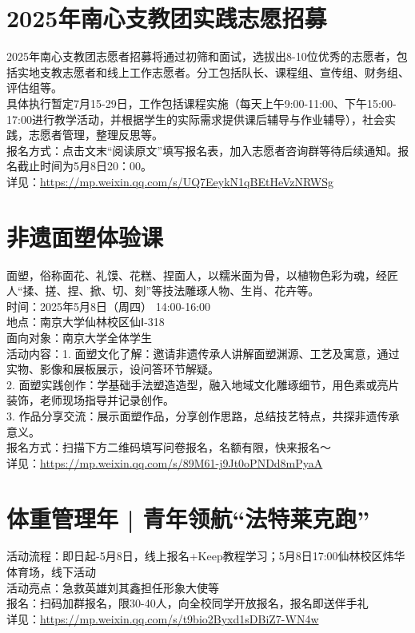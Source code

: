 \documentclass[letterpaper, 12pt]{article}
\begin{document}
\begin{multicols}{2}
\section{2025年南心支教团实践志愿招募} %
2025年南心支教团志愿者招募将通过初筛和面试，选拔出8-10位优秀的志愿者，包括实地支教志愿者和线上工作志愿者。分工包括队长、课程组、宣传组、财务组、评估组等。
\\具体执行暂定7月15-29日，工作包括课程实施（每天上午9:00-11:00、下午15:00-17:00进行教学活动，并根据学生的实际需求提供课后辅导与作业辅导），社会实践，志愿者管理，整理反思等。
\\报名方式：点击文末“阅读原文”填写报名表，加入志愿者咨询群等待后续通知。报名截止时间为5月8日20：00。
\\详见：\url{https://mp.weixin.qq.com/s/UQ7EeykN1qBEtHeVzNRWSg}

\section{非遗面塑体验课} %
面塑，俗称面花、礼馍、花糕、捏面人，以糯米面为骨，以植物色彩为魂，经匠人“揉、搓、捏、掀、切、刻”等技法雕琢人物、生肖、花卉等。
\\时间：2025年5月8日（周四） 14:00-16:00
\\地点：南京大学仙林校区仙Ⅰ-318
\\面向对象：南京大学全体学生
\\活动内容：1. 面塑文化了解：邀请非遗传承人讲解面塑渊源、工艺及寓意，通过实物、影像和展板展示，设问答环节解疑。
\\2. 面塑实践创作：学基础手法塑造造型，融入地域文化雕琢细节，用色素或亮片装饰，老师现场指导并记录创作。
\\3. 作品分享交流：展示面塑作品，分享创作思路，总结技艺特点，共探非遗传承意义。
\\报名方式：扫描下方二维码填写问卷报名，名额有限，快来报名～
\\详见：\url{https://mp.weixin.qq.com/s/89M61-j9Jt0oPNDd8mPyaA}

\section{体重管理年 | 青年领航“法特莱克跑”} %
活动流程：即日起-5月8日，线上报名+Keep教程学习；5月8日17:00仙林校区炜华体育场，线下活动
\\活动亮点：急救英雄刘其鑫担任形象大使等
\\报名：扫码加群报名，限30-40人，向全校同学开放报名，报名即送伴手礼
\\详见：\url{https://mp.weixin.qq.com/s/t9bio2Byxd1sDBiZ7-WN4w}

\end{multicols}
\end{document}
